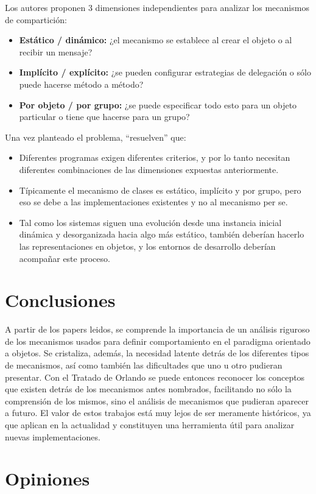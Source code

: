 \documentclass[a4paper,10pt]{article}
\newcommand{\strongitem}[1]{\item \textbf{#1:}}
\begin{document}
Los autores proponen 3 dimensiones independientes para analizar los mecanismos de compartición:
\begin{itemize}
	\strongitem{Estático / dinámico} ¿el mecanismo se establece al crear el objeto o al recibir un mensaje?
	\strongitem{Implícito / explícito} ¿se pueden configurar estrategias de delegación o sólo puede hacerse método a método?
	\strongitem{Por objeto / por grupo} ¿se puede especificar todo esto para un objeto particular o tiene que hacerse para un grupo?
\end{itemize}

Una vez planteado el problema, ``resuelven'' que:
\begin{itemize}
	\item Diferentes programas exigen diferentes criterios, y por lo tanto necesitan diferentes combinaciones de las dimensiones expuestas anteriormente.
	\item Típicamente el mecanismo de clases es estático, implícito y por grupo, pero eso se debe a las implementaciones existentes y no al mecanismo per se.
	\item Tal como los sistemas siguen una evolución desde una instancia inicial dinámica y desorganizada hacia algo más estático, también deberían hacerlo las representaciones en objetos, y los entornos de desarrollo deberían acompañar este proceso.
\end{itemize}

\section{Conclusiones}

A partir de los papers leidos, se comprende la importancia de un análisis riguroso de los mecanismos usados para definir comportamiento en el paradigma orientado a objetos. Se cristaliza, además, la necesidad latente detrás de los diferentes tipos de mecanismos, así como también las dificultades que uno u otro pudieran presentar.
Con el Tratado de Orlando se puede entonces reconocer los conceptos que existen detrás de los mecanismos antes nombrados, facilitando no sólo la comprensión de los mismos, sino el análisis de mecanismos que pudieran aparecer a futuro. El valor de estos trabajos está muy lejos de ser meramente históricos, ya que aplican en la actualidad y constituyen una herramienta útil para analizar nuevas implementaciones.



\section{Opiniones}
\end{document}
